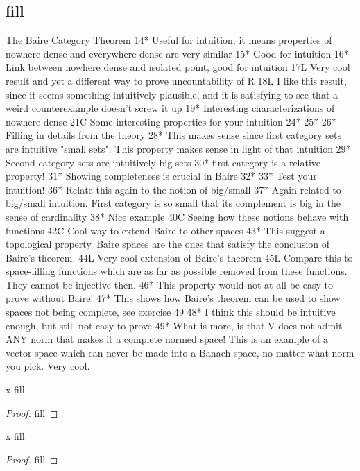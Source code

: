\subsection{fill}

The Baire Category Theorem
14* Useful for intuition, it means properties of nowhere dense and everywhere dense are very similar 
15* Good for intuition 
16* Link between nowhere dense and isolated point, good for intuition 
17L Very cool result and yet a different way to prove uncountability of R 
18L I like this result, since it seems something intuitively plausible, and it is satisfying to see that a weird counterexample doesn't screw it up
19* Interesting characterizations of nowhere dense 
21C Some interesting properties for your intuition 
24*
25*
26* Filling in details from the theory 
28* This makes sense since first category sets are intuitive "small sets". This property makes sense in light of that intuition
29* Second category sets are intuitively big sets 
30* first category is a relative property!
31* Showing completeness is crucial in Baire 
32* 
33* Test your intuition! 
36* Relate this again to the notion of big/small 
37* Again related to big/small intuition. First category is so small that its complement is big in the sense of cardinality 
38* Nice example 
40C Seeing how these notions behave with functions 
42C Cool way to extend Baire to other spaces 
43* This suggest a topological property. Baire spaces are the ones that satisfy the conclusion of Baire's theorem.
44L Very cool extension of Baire's theorem
45L Compare this to space-filling functions which are as far as possible removed from these functions. They cannot be injective then.
46* This property would not at all be easy to prove without Baire!
47* This shows how Baire's theorem can be used to show spaces not being complete, see exercise 49
48* I think this should be intuitive enough, but still not easy to prove 
49* What is more, is that V does not admit ANY norm that makes it a complete normed space! This is an example of a vector space which can never be made into a Banach space, no matter what norm you pick. Very cool. 


\begin{exercise}{x}
fill
\end{exercise}
\begin{proof}
fill
\end{proof} 

\begin{exercise}{x}
fill
\end{exercise}
\begin{proof}
fill
\end{proof} 

